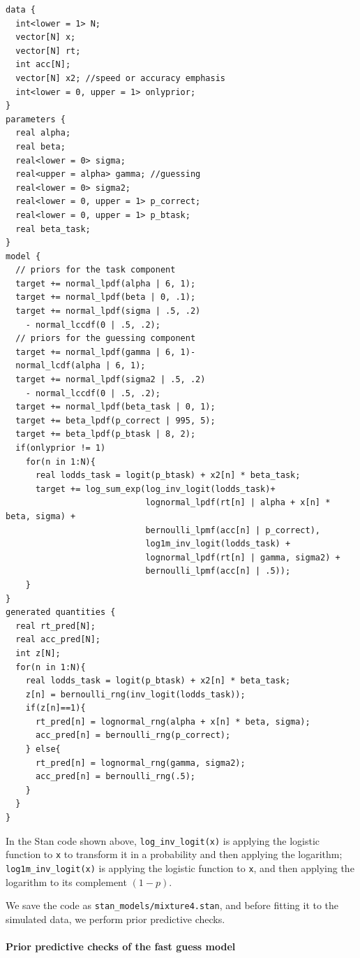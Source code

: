 \documentclass[12pt,]{krantz}
\let\oldparagraph\paragraph
\renewcommand{\paragraph}[1]{\oldparagraph{#1}\mbox{}}
\theoremstyle{definition}
\theoremstyle{definition}
\theoremstyle{definition}
\theoremstyle{remark}
\begin{document}
\begin{verbatim}
data {
  int<lower = 1> N;
  vector[N] x;
  vector[N] rt;
  int acc[N];
  vector[N] x2; //speed or accuracy emphasis
  int<lower = 0, upper = 1> onlyprior;
}
parameters {
  real alpha;
  real beta;
  real<lower = 0> sigma;
  real<upper = alpha> gamma; //guessing
  real<lower = 0> sigma2;
  real<lower = 0, upper = 1> p_correct;
  real<lower = 0, upper = 1> p_btask;
  real beta_task;
}
model {
  // priors for the task component
  target += normal_lpdf(alpha | 6, 1);
  target += normal_lpdf(beta | 0, .1);
  target += normal_lpdf(sigma | .5, .2)
    - normal_lccdf(0 | .5, .2);
  // priors for the guessing component
  target += normal_lpdf(gamma | 6, 1)-
  normal_lcdf(alpha | 6, 1);
  target += normal_lpdf(sigma2 | .5, .2)
    - normal_lccdf(0 | .5, .2);
  target += normal_lpdf(beta_task | 0, 1);
  target += beta_lpdf(p_correct | 995, 5);
  target += beta_lpdf(p_btask | 8, 2);
  if(onlyprior != 1)
    for(n in 1:N){
      real lodds_task = logit(p_btask) + x2[n] * beta_task;
      target += log_sum_exp(log_inv_logit(lodds_task)+
                            lognormal_lpdf(rt[n] | alpha + x[n] * beta, sigma) +
                            bernoulli_lpmf(acc[n] | p_correct),
                            log1m_inv_logit(lodds_task) +
                            lognormal_lpdf(rt[n] | gamma, sigma2) +
                            bernoulli_lpmf(acc[n] | .5));
    }
}
generated quantities {
  real rt_pred[N];
  real acc_pred[N];
  int z[N]; 
  for(n in 1:N){
    real lodds_task = logit(p_btask) + x2[n] * beta_task;
    z[n] = bernoulli_rng(inv_logit(lodds_task));
    if(z[n]==1){
      rt_pred[n] = lognormal_rng(alpha + x[n] * beta, sigma);
      acc_pred[n] = bernoulli_rng(p_correct);
    } else{
      rt_pred[n] = lognormal_rng(gamma, sigma2);
      acc_pred[n] = bernoulli_rng(.5);
    }
  }
}
\end{verbatim}

In the Stan code shown above, \texttt{log\_inv\_logit(x)} is applying the logistic function to \texttt{x} to transform it in a probability and then applying the logarithm; \texttt{log1m\_inv\_logit(x)} is applying the logistic function to \texttt{x}, and then applying the logarithm to its complement \((1 - p)\).

We save the code as \texttt{stan\_models/mixture4.stan}, and before fitting it to the simulated data, we perform prior predictive checks.

\hypertarget{prior-predictive-checks-of-the-fast-guess-model}{%
\paragraph{Prior predictive checks of the fast guess model}\label{prior-predictive-checks-of-the-fast-guess-model}}
\end{document}
